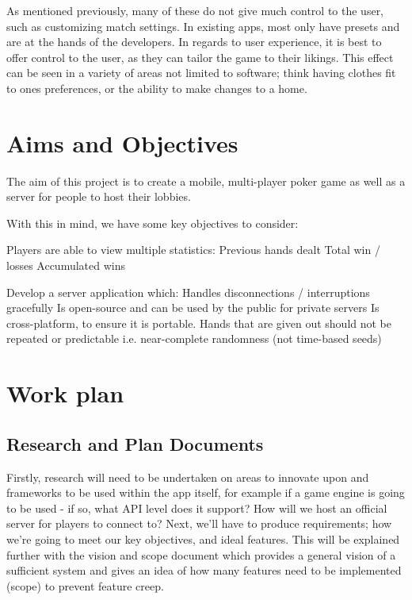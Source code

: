\documentclass[11pt]{article}
\begin{document}
{\begin{center}
\end{center}

As mentioned previously, many of these do not give much control to the user, such as customizing match settings. In existing apps, most only have presets and are at the hands of the developers. In regards to user experience, it is best to offer control to the user, as they can tailor the game to their likings. This effect can be seen in a variety of areas not limited to software; think having clothes fit to ones preferences, or the ability to make changes to a home. \cite{customize} %

\newpage
\section*{Aims and Objectives}

The aim of this project is to create a mobile, multi-player poker game as well as a server for people to host their lobbies. 

With this in mind, we have some key objectives to consider: 

\begin{outline}
	\1 Players are able to view multiple statistics:
		\2 Previous hands dealt
		\2 Total win / losses
		\2 Accumulated wins	
	
	\1 Develop a server application which: 
		\2 Handles disconnections / interruptions gracefully
		\2 Is open-source and can be used by the public for private servers
		\2 Is cross-platform, to ensure it is portable.
	\1 Hands that are given out should not be repeated or predictable i.e. near-complete randomness (not time-based seeds)
\end{outline}

\newpage
\section*{Work plan}


\subsection*{Research and Plan Documents}

Firstly, research will need to be undertaken on areas to innovate upon and frameworks to be used within the app itself, for example if a game engine is going to be used - if so, what API level does it support? How will we host an official server for players to connect to? Next, we'll have to produce requirements; how we're going to meet our key objectives, and ideal features. This will be explained further with the vision and scope document which provides a general vision of a sufficient system and gives an idea of how many features need to be implemented (scope) to prevent feature creep.


}
\end{document}

